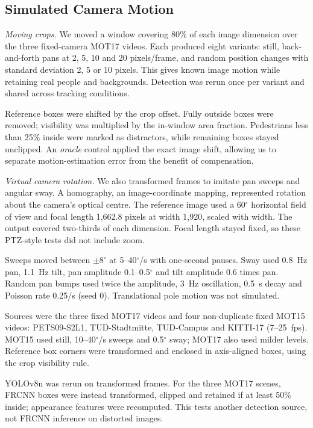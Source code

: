 \documentclass[conference]{IEEEtran}
\begin{document}
\subsection{Simulated Camera Motion}
\emph{Moving crops.} We moved a window covering 80\% of each image dimension over the three fixed-camera MOT17 videos. Each produced eight variants: still, back-and-forth pans at 2, 5, 10 and 20 pixels/frame, and random position changes with standard deviation 2, 5 or 10 pixels. This gives known image motion while retaining real people and backgrounds. Detection was rerun once per variant and shared across tracking conditions.

Reference boxes were shifted by the crop offset. Fully outside boxes were removed; visibility was multiplied by the in-window area fraction. Pedestrians less than 25\% inside were marked as distractors, while remaining boxes stayed unclipped. An \emph{oracle} control applied the exact image shift, allowing us to separate motion-estimation error from the benefit of compensation.

\emph{Virtual camera rotation.} We also transformed frames to imitate pan sweeps and angular sway. A homography, an image-coordinate mapping, represented rotation about the camera's optical centre. The reference image used a 60$^\circ$ horizontal field of view and focal length 1,662.8 pixels at width 1,920, scaled with width. The output covered two-thirds of each dimension. Focal length stayed fixed, so these PTZ-style tests did not include zoom.

Sweeps moved between $\pm8^\circ$ at 5--40$^\circ$/s with one-second pauses. Sway used 0.8~Hz pan, 1.1~Hz tilt, pan amplitude 0.1--0.5$^\circ$ and tilt amplitude 0.6 times pan. Random pan bumps used twice the amplitude, 3~Hz oscillation, 0.5~s decay and Poisson rate 0.25/s (seed 0). Translational pole motion was not simulated.

Sources were the three fixed MOT17 videos and four non-duplicate fixed MOT15 videos: PETS09-S2L1, TUD-Stadtmitte, TUD-Campus and KITTI-17 (7--25~fps). MOT15 used still, 10--40$^\circ$/s sweeps and 0.5$^\circ$ sway; MOT17 also used milder levels. Reference box corners were transformed and enclosed in axis-aligned boxes, using the crop visibility rule.

YOLOv8n was rerun on transformed frames. For the three MOT17 scenes, FRCNN boxes were instead transformed, clipped and retained if at least 50\% inside; appearance features were recomputed. This tests another detection source, not FRCNN inference on distorted images.
\end{document}
